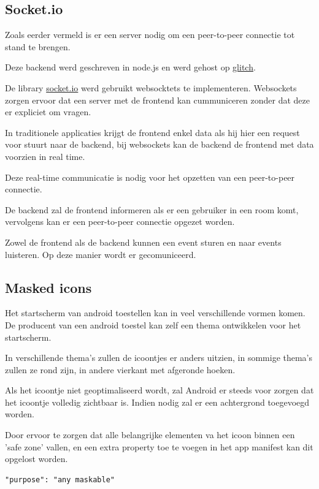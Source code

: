 	\subsection{Socket.io}
	
		Zoals eerder vermeld is er een server nodig om een peer-to-peer connectie tot stand te brengen.
		
		Deze backend werd geschreven in node.js en werd gehost op \href{https://glitch.com/}{glitch}.
		
		De library \href{https://socket.io/}{socket.io} werd gebruikt websocktets te implementeren. Websockets zorgen ervoor dat een server met de frontend kan cummuniceren zonder dat deze er expliciet om vragen. 
		
		In traditionele applicaties krijgt de frontend enkel data als hij hier een request voor stuurt naar de backend, bij websockets kan de backend de frontend met data voorzien in real time.
		\autocite{Mozilla2020e}
		
		Deze real-time communicatie is nodig voor het opzetten van een peer-to-peer connectie.
		
		De backend zal de frontend informeren als er een gebruiker in een room komt, vervolgens kan er een peer-to-peer connectie opgezet worden.
		
		Zowel de frontend als de backend kunnen een event sturen en naar events luisteren. Op deze manier wordt er gecomuniceerd. 	
		
			
	\subsection{Masked icons}
	
		Het startscherm van android toestellen kan in veel verschillende vormen komen. De producent van een android toestel kan zelf een thema ontwikkelen voor het startscherm.
		
		In verschillende thema's zullen de icoontjes er anders uitzien, in sommige thema's zullen ze rond zijn, in andere vierkant met afgeronde hoeken. 
		
		Als het icoontje niet geoptimaliseerd wordt, zal Android er steeds voor zorgen dat het icoontje volledig zichtbaar is. Indien nodig zal er een achtergrond toegevoegd worden.
		
		Door ervoor te zorgen dat alle belangrijke elementen va het icoon binnen een 'safe zone' vallen, en een extra property toe te voegen in het app manifest kan dit opgelost worden.
		
\begin{lstlisting}
"purpose": "any maskable" 
\end{lstlisting}

